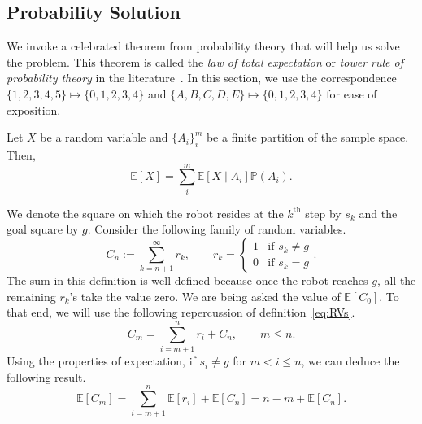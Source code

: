 \subsection{Probability Solution}
\label{ssec:prob_sol}
%
We invoke a celebrated theorem from probability theory that will help us solve
the problem. This theorem is called the \textit{law of total expectation} or
\textit{tower rule of probability theory} in the
literature~\cite{bertsekas2002introduction}.
%
In this section, we use the correspondence $\{1, 2, 3, 4, 5\} \mapsto \{0, 1, 2,
3, 4\}$ and $\{A, B, C, D, E\} \mapsto \{0, 1, 2, 3, 4\}$ for ease of
exposition.
%
\begin{thm} \label{thm:tower} Let $X$ be a random variable and
    $\{A_i\}_i^m$ be a finite partition of the sample space. Then, 
    \[ \mathbb{E}[X] = \sum_i^m \mathbb{E}\left[ X \mid A_i \right]
    \mathbb{P}(A_i). \]
\end{thm}
%
We denote the square on which the robot resides at the $k^{\text{th}}$ step by
$s_k$ and the goal square by $g$. Consider the following family of random
variables.
%
\begin{equation}
    C_n := \sum_{k=n+1}^\infty r_k, \qquad r_k = 
\begin{cases}
    1 & \mbox{if } s_k \neq g \\
    0 & \mbox{if } s_k = g
\end{cases}.
\label{eq:RVs}
\end{equation}
%
The sum in this definition is well-defined because once the robot reaches $g$,
all the remaining $r_k$'s take the value zero. We are being asked the value of
$\mathbb{E}[C_0]$. To that end, we will use the following repercussion of
definition~\eqref{eq:RVs}.
\begin{equation*} 
    C_m = \sum_{i=m+1}^n r_i + C_n, \qquad m \leq n.
\end{equation*}
Using the properties of expectation, if $s_i \neq g$ for $m < i \leq n$, we can
deduce the following result.
\begin{equation*} 
    \mathbb{E}[C_m] = \sum_{i=m+1}^n \mathbb{E}[r_i] + \mathbb{E}[C_n] = n-m + \mathbb{E}[C_n].
\end{equation*}
